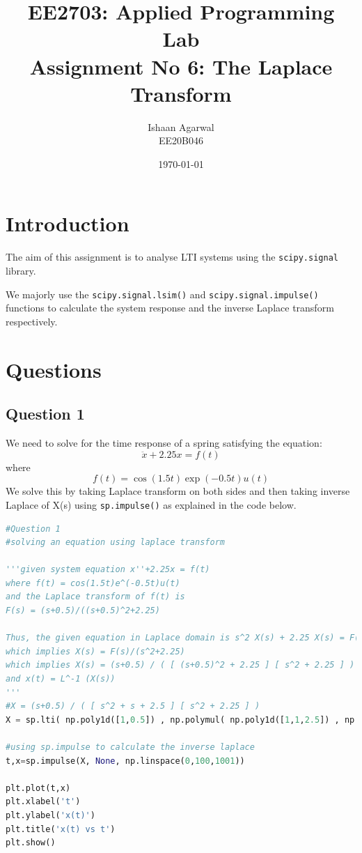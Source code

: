 \documentclass[11pt, a4paper]{article}
\title{EE2703: Applied Programming Lab \\ Assignment No 6: The Laplace Transform} %
\author{Ishaan Agarwal \\ EE20B046} %
\date{\today} %
\begin{document}
		
		
\maketitle %

\section{Introduction}
The aim of this assignment is to analyse LTI systems using the \texttt{scipy.signal} library.

We majorly use the \texttt{scipy.signal.lsim()} and \texttt{scipy.signal.impulse()} functions to calculate the system response and the inverse Laplace transform respectively.


\section{Questions}
\subsection{Question 1}

We need to solve for the time response of a spring satisfying the equation:
\[\ddot{x} + 2.25x = f(t)\]
where
\[f(t) = \cos(1.5t)\exp(-0.5t)u(t)\]
We solve this by taking Laplace transform on both sides and then taking inverse Laplace of X(s) using \texttt{sp.impulse()} as explained in the code below.

\begin{lstlisting}[language = Python]
#Question 1
#solving an equation using laplace transform

'''given system equation x''+2.25x = f(t)
where f(t) = cos(1.5t)e^(-0.5t)u(t)
and the Laplace transform of f(t) is
F(s) = (s+0.5)/((s+0.5)^2+2.25)

Thus, the given equation in Laplace domain is s^2 X(s) + 2.25 X(s) = F(s)
which implies X(s) = F(s)/(s^2+2.25)
which implies X(s) = (s+0.5) / ( [ (s+0.5)^2 + 2.25 ] [ s^2 + 2.25 ] )
and x(t) = L^-1 (X(s))
'''
#X = (s+0.5) / ( [ s^2 + s + 2.5 ] [ s^2 + 2.25 ] )
X = sp.lti( np.poly1d([1,0.5]) , np.polymul( np.poly1d([1,1,2.5]) , np.poly1d([1,0,2.25]) ) )

#using sp.impulse to calculate the inverse laplace
t,x=sp.impulse(X, None, np.linspace(0,100,1001))

plt.plot(t,x)
plt.xlabel('t')
plt.ylabel('x(t)')
plt.title('x(t) vs t')
plt.show()
\end{lstlisting}
\end{document}
